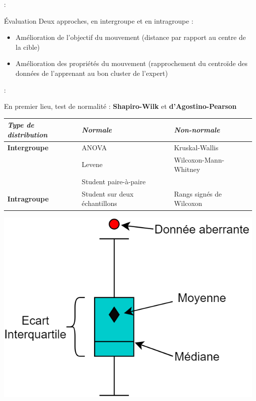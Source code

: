 \documentclass[svgnames]{beamer}
\begin{document}
	\begin{frame}{\subsecname : \MakeLowercase{\subsubsecname}}
		\begin{block}{Évaluation}
			Deux approches, en intergroupe et en intragroupe :
			\begin{itemize}[label=$\bullet$]
				\item Amélioration de l'objectif du mouvement (distance par rapport au centre de la cible)
				\item Amélioration des propriétés du mouvement (rapprochement du centroïde des données de l'apprenant au bon cluster de l'expert)
			\end{itemize}
		\end{block}
	\end{frame}
	
	\begin{frame}{\subsecname : \MakeLowercase{\subsubsecname}}
	
		En premier lieu, test de normalité : \textbf{Shapiro-Wilk} et \textbf{d'Agostino-Pearson}
		\begin{table}[]
			\begin{adjustbox}{max width=\textwidth}
			\begin{tabular}{l|l|l}
				\textit{Type de distribution} & \textit{Normale} & \textit{Non-normale} \\\hline
				\textbf{Intergroupe} & ANOVA & Kruskal-Wallis \\
 				& Levene & Wilcoxon-Mann-Whitney \\
 				& Student paire-à-paire &  \\\hline
				\textbf{Intragroupe} & Student sur deux échantillons & Rangs signés de Wilcoxon
			\end{tabular}
			\end{adjustbox}
		\end{table}
		
		\centering
		\includegraphics[scale=0.2]{img/boxplot.png}
	\end{frame}
	
\end{document}
